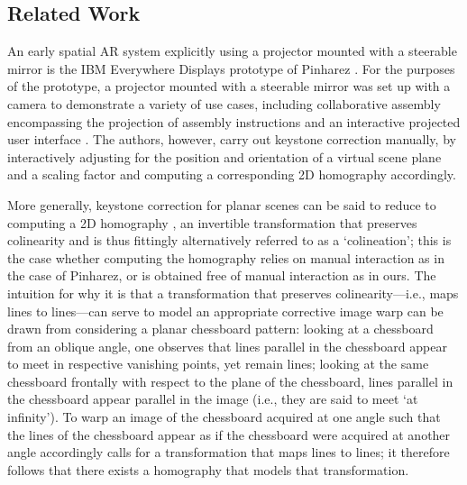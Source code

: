 \documentclass[review]{elsarticle}
\begin{document}
\subsection{Related Work}

An early spatial AR system explicitly using a projector mounted with a steerable mirror is the IBM Everywhere Displays prototype of Pinharez \cite{pinhanez2001everywhere}. For the purposes of the prototype, a projector mounted with a steerable mirror was set up with a camera to demonstrate a variety of use cases, including collaborative assembly encompassing the projection of assembly instructions and an interactive projected user interface \cite{kjeldsen2002interacting,pinhanez2003applications}. The authors, however, carry out keystone correction manually, by interactively adjusting for the position and orientation of a virtual scene plane and a scaling factor and computing a corresponding 2D homography accordingly. %

More generally, keystone correction for planar scenes can be said to reduce to computing a 2D homography \cite{Hartley2004}, an invertible transformation that preserves colinearity and is thus fittingly alternatively referred to as a `colineation'; this is the case whether computing the homography relies on manual interaction as in the case of Pinharez, or is obtained free of manual interaction as in ours. The intuition for why it is that a transformation that preserves colinearity---i.e., maps lines to lines---can serve to model an appropriate corrective image warp can be drawn from considering a planar chessboard pattern: looking at a chessboard from an oblique angle, one observes that lines parallel in the chessboard appear to meet in respective vanishing points, yet remain lines; looking at the same chessboard frontally with respect to the plane of the chessboard, lines parallel in the chessboard appear parallel in the image (i.e., they are said to meet `at infinity'). To warp an image of the chessboard acquired at one angle such that the lines of the chessboard appear as if the chessboard were acquired at another angle accordingly calls for a transformation that maps lines to lines; it therefore follows that there exists a homography that models that transformation.
\end{document}
